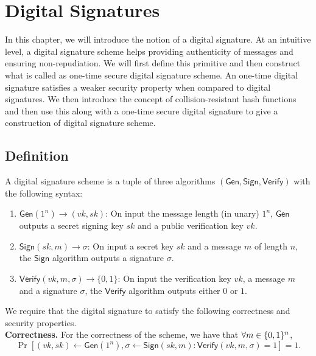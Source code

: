 \newcommand{\Gen}{\mathsf{Gen}}
\newcommand{\Sign}{\mathsf{Sign}}
\newcommand{\Verify}{\mathsf{Verify}}
\newcommand{\negl}{\mathsf{negl}}
\newcommand{\abort}{\mathsf{abort}}
\newcommand{\Sampler}{\mathsf{Sampler}}
\newcommand{\Eval}{\mathsf{Eval}}
\renewcommand{\tag}{\mathsf{tag}}
\newcommand{\PRF}{\mathsf{PRF}}

\chapter{Digital Signatures}

In this chapter, we will introduce the notion of a digital signature. At an intuitive level, a digital signature scheme helps providing authenticity of messages and ensuring non-repudiation. We will first define this primitive and then construct what is called as one-time secure digital signature scheme. An one-time digital signature satisfies a weaker security property when compared to digital signatures. We then introduce the concept of collision-resistant hash functions and then use this along with a one-time secure digital signature to give a construction of digital signature scheme.

\section{Definition}

A digital signature scheme is a tuple of three algorithms $(\Gen,\Sign,\Verify)$ with the following syntax:
\begin{enumerate}
\item $\Gen(1^n)\to (vk,sk)$: On input the message length (in unary) $1^n$, $\Gen$ outputs a secret signing key $sk$ and a public verification key $vk$.
\item $\Sign(sk, m) \to \sigma$: On input a secret key $sk$ and a message $m$ of length $n$, the $\Sign$ algorithm outputs a signature $\sigma$.
\item $\Verify(vk, m, \sigma) \to \{0,1\}$: On input the verification key $vk$, a message $m$ and a signature $\sigma$, the $\Verify$ algorithm outputs either $0$ or $1$.
\end{enumerate}

We require that the digital signature to satisfy the following correctness and security properties.\\
\medskip
\noindent\textbf{Correctness.} For the correctness of the scheme, we have that
$\forall m \in \{0,1\}^n$,
\[\Pr \left[ (vk,sk) \gets \Gen(1^n), \sigma \leftarrow \Sign(sk,m) : \Verify(vk, m, \sigma) = 1 \right] = 1.\]

